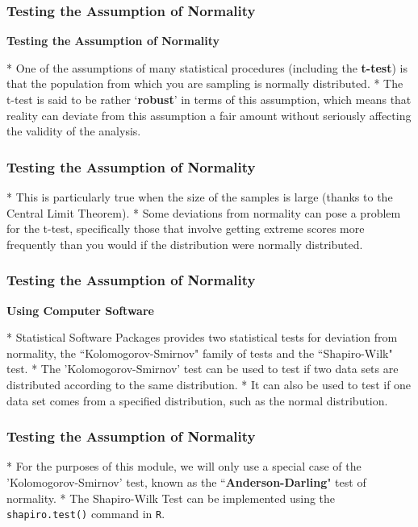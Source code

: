 


\frametitle{Testing the Assumption of Normality}

\textbf{Testing the Assumption of Normality}


* One of the assumptions of many statistical procedures (including the \textbf{t-test}) is that the population from which you are sampling is normally distributed. 
* The t-test is said to be rather ‘\textbf{robust}’ in terms of this assumption, which means that reality can deviate from this assumption a fair amount without seriously affecting the validity of the analysis. 






\frametitle{Testing the Assumption of Normality}




*  This is particularly true when the size of the samples is large (thanks to the Central Limit Theorem). 
*  Some deviations from normality can pose a problem for the t-test, specifically those that involve getting extreme scores more frequently than you would if the distribution were normally distributed.






\frametitle{Testing the Assumption of Normality}

\noindent \textbf{Using Computer Software}

* Statistical Software Packages provides two statistical tests for deviation from normality, the ``Kolomogorov-Smirnov" family of tests and the ``Shapiro-Wilk" test.
* The 'Kolomogorov-Smirnov' test can be used to test if two data sets are distributed according to the same distribution. 
* It can also be used to test if one data set comes from a specified distribution, such as the normal distribution. 






\frametitle{Testing the Assumption of Normality}


* For the purposes of this module, we will only use a special case of the 'Kolomogorov-Smirnov' test, known as the ``\textbf{Anderson-Darling}" test of normality.
*  The Shapiro-Wilk Test can be implemented using the \texttt{shapiro.test()} command in \texttt{R}.




